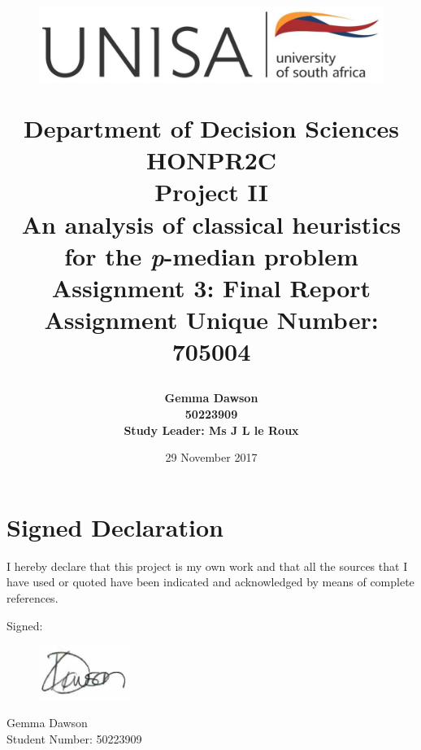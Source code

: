 \documentclass[11pt]{article}
\newcommand{\np}{\newpage}
\begin{document}
	\title{
		\begin{figure}[!htb]
			\begin{center}
				\includegraphics[width=12cm]{unisa.png}
			\end{center}
		\end{figure}
		Department of Decision Sciences\\[3mm]
		HONPR2C\\
		Project II \\[2cm]		
		{\huge \textbf{An analysis of classical heuristics for the \emph{p}-median problem}}\\[15mm]
		Assignment 3: Final Report\\[3mm]
		Assignment Unique Number: 705004\\[2cm]
	}
	\author{\textbf{\Large Gemma Dawson}\\[3mm]
		\textbf{\Large 50223909}\\[3mm]
		\textbf{Study Leader: Ms J L le Roux}
	}
	\date{\Large 29 November 2017}	
	\maketitle
	\thispagestyle{empty}
	\np
	
	\section*{Signed Declaration}
	I hereby declare that this project is my own work and that all the sources that I have used or quoted have been indicated and acknowledged by means of complete references.
	
	Signed:
	\begin{figure}[!htb]
			\includegraphics[width=3cm]{signature.png}
	\end{figure}

	Gemma Dawson\\
	Student Number: 50223909\\
	
	
	\thispagestyle{empty}
	\np
	
\end{document}
